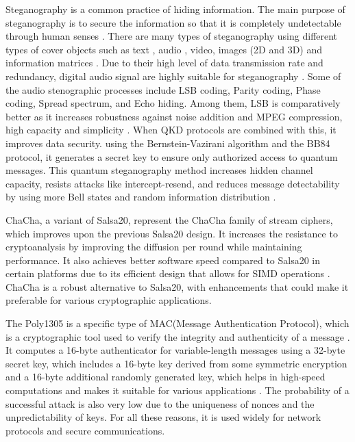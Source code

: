 \documentclass[a4paper]{cas-sc}
\begin{document}
Steganography is a common practice of hiding information. The main purpose of steganography is to secure the information so that it is completely undetectable through human senses \cite{amin2003information}. There are many types of steganography using different types of cover objects such as text \cite{yang2018rnn}, audio \cite{jayaram2011information}\cite{hemeida2021comparative}\cite{djebbar2012comparative}, video, images (2D and 3D) \cite{farrag2020secure} and information matrices \cite{mashaly2019multiple}. Due to their high level of data transmission rate and redundancy, digital audio signal are highly suitable for steganography \cite{singh2014survey}. Some of the audio stenographic processes include LSB coding, Parity coding, Phase coding, Spread spectrum, and Echo hiding. Among them, LSB is comparatively better as it increases robustness against noise addition and MPEG compression, high capacity and simplicity \cite{cvejic2004increasing}\cite{jayaram2011information}. When QKD protocols are combined with this, it improves data security. using the Bernstein-Vazirani algorithm and the BB84 protocol, it generates a secret key to ensure only authorized access to quantum messages. This quantum steganography method increases hidden channel capacity, resists attacks like intercept-resend, and reduces message detectability by using more Bell states and random information distribution \cite{yalla2022novel}.

ChaCha, a variant of Salsa20, represent the ChaCha family of stream ciphers, which improves upon the previous Salsa20 design. It increases the resistance to cryptoanalysis by improving the diffusion per round while maintaining performance. It also achieves better software speed compared to Salsa20 in certain platforms due to its efficient design that allows for SIMD operations \cite{bernstein2008chacha}. ChaCha is a robust alternative to Salsa20, with enhancements that could make it preferable for various cryptographic applications.

The Poly1305 is a specific type of MAC(Message Authentication Protocol), which is a cryptographic tool used to verify the integrity and authenticity of a message \cite{bernstein2005poly1305}. It computes a 16-byte authenticator for variable-length messages using a 32-byte secret key, which includes a 16-byte key derived from some symmetric encryption and a 16-byte additional randomly generated key, which helps in high-speed computations and makes it suitable for various applications \cite{bernstein2005poly1305}. The probability of a successful attack is also very low due to the uniqueness of nonces and the unpredictability of keys. For all these reasons, it is used widely for network protocols and secure communications.
\end{document}
